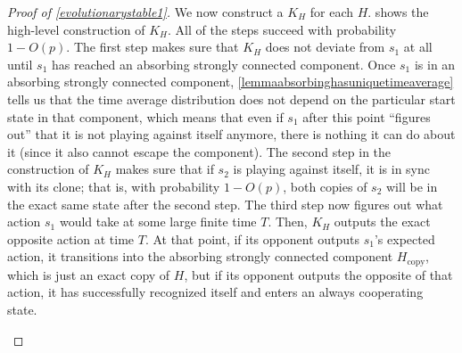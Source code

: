 \documentclass[11pt]{amsart}
\theoremstyle{definition}
\theoremstyle{remark}
\begin{document}
\begin{proof}[Proof of \cref{evolutionarystable1}]
      We now construct a $K_H$ for each $H$.  shows the high-level construction of $K_H$.
       All of the steps succeed with probability $1 - O(p)$. The first step makes sure that $K_H$ does not deviate from $s_1$ at all
        until $s_1$ has reached an absorbing strongly connected component. 
       Once $s_1$ is in an absorbing strongly connected component, \cref{lemmaabsorbinghasuniquetimeaverage} tells us that the time average distribution does not depend on the particular start state in that component, which means that even if $s_1$ after this point ``figures out'' that it is not playing against itself anymore, there is nothing it can do about it (since it also cannot escape the component). 
      The second step in the construction of $K_H$ makes sure that if $s_2$ is playing against itself, it is in sync with its clone; that is, with probability $1 - O(p)$, both copies of $s_2$ will be in the exact same state after the second step. 
      The third step now figures out what action $s_1$ would take at some large finite time $T$. 
      Then, $K_H$ outputs the exact opposite action at time $T$. 
      At that point, if its opponent outputs $s_1$'s expected action, it transitions into the absorbing strongly connected component $H_\text{copy}$, which is just an exact copy of $H$, but if its opponent outputs the opposite of that action, it has successfully recognized itself and enters an always cooperating state.

      \begin{figure}
        \centering
\end{figure}
\end{proof}
\end{document}
